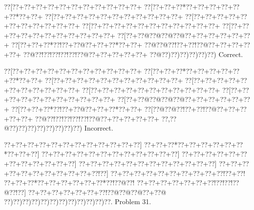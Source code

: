 \documentclass[a5paper]{article}
\begin{document}
\begin{center}
{\goo
\0??[\0??+\0??+\0??+\0??+\0??+\0??+\0??+\0??+\0??+\0??+\0??+
\0??[\0??+\0??+\0??*\0??+\0??+\0??+\0??+\0??+\0??*\0??+\0??+
\0??[\0??+\0??+\0??+\0??+\0??+\0??+\0??+\0??+\0??+\0??+\0??+
\0??[\0??+\0??+\0??+\0??+\0??+\0??+\0??+\0??+\0??+\0??+\0??+
\0??[\0??+\0??+\0??+\0??+\0??+\0??+\0??+\0??+\0??+\0??+\0??+
\0??[\0??+\0??+\0??+\0??+\0??+\0??+\0??+\0??+\0??+\0??+\0??+
\0??[\0??+\0??@\0??@\0??@\0??@\0??+\0??+\0??+\0??+\0??+\0??+
\0??[\0??+\0??+\0??*\0??!\0??+\0??@\0??+\0??+\0??*\0??+\0??+
\0??@\0??@\0??!\0??+\0??!\0??@\0??+\0??+\0??+\0??+\0??+
\0??@\0??!\0??!\0??!\0??!\0??!\0??@\0??+\0??+\0??+\0??+\0??+
\0??@\0??)\0??)\0??)\0??)\0??)\0??)
}
Correct. 

\end{center}
\begin{center}
{\goo
\0??[\0??+\0??+\0??+\0??+\0??+\0??+\0??+\0??+\0??+\0??+\0??+
\0??[\0??+\0??+\0??*\0??+\0??+\0??+\0??+\0??+\0??*\0??+\0??+
\0??[\0??+\0??+\0??+\0??+\0??+\0??+\0??+\0??+\0??+\0??+\0??+
\0??[\0??+\0??+\0??+\0??+\0??+\0??+\0??+\0??+\0??+\0??+\0??+
\0??[\0??+\0??+\0??+\0??+\0??+\0??+\0??+\0??+\0??+\0??+\0??+
\0??[\0??+\0??+\0??+\0??+\0??+\0??+\0??+\0??+\0??+\0??+\0??+
\0??[\0??+\0??@\0??@\0??@\0??@\0??+\0??+\0??+\0??+\0??+\0??+
\0??[\0??+\0??+\0??*\0??!\0??+\0??@\0??+\0??+\0??*\0??+\0??+
\0??[\0??@\0??@\0??!\0??+\0??!\0??@\0??+\0??+\0??+\0??+\0??+
\0??@\0??!\0??!\0??!\0??!\0??!\0??@\0??+\0??+\0??+\0??+\0??+
\0??,\0??@\0??)\0??)\0??)\0??)\0??)\0??)\0??)\0??)
}
Incorrect. 

\end{center}
\newpage
\begin{center}
{\goo
\0??+\0??+\0??+\0??+\0??+\0??+\0??+\0??+\0??+\0??+\0??+\0??]
\0??+\0??+\0??*\0??+\0??+\0??+\0??+\0??+\0??*\0??+\0??+\0??]
\0??+\0??+\0??+\0??+\0??+\0??+\0??+\0??+\0??+\0??+\0??+\0??]
\0??+\0??+\0??+\0??+\0??+\0??+\0??+\0??+\0??+\0??+\0??+\0??]
\0??+\0??+\0??+\0??+\0??+\0??+\0??+\0??+\0??+\0??+\0??+\0??]
\0??+\0??+\0??+\0??+\0??+\0??+\0??+\0??+\0??+\0??+\0??!\0??]
\0??+\0??+\0??+\0??+\0??+\0??+\0??+\0??+\0??+\0??!\0??+\0??!
\0??+\0??+\0??*\0??+\0??+\0??+\0??+\0??+\0??*\0??!\0??@\0??!
\0??+\0??+\0??+\0??+\0??+\0??+\0??!\0??!\0??!\0??@\0??!\0??]
\0??+\0??+\0??+\0??+\0??+\0??+\0??!\0??@\0??@\0??@\0??+\0??@
\0??)\0??)\0??)\0??)\0??)\0??)\0??)\0??)\0??)\0??)\0??)\0??.
}
Problem 31.

\end{center}
\end{document}
